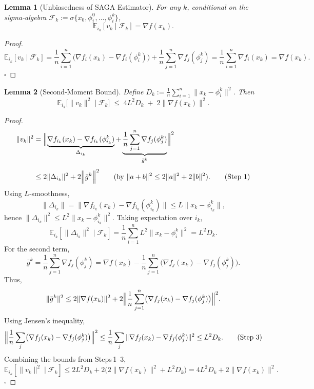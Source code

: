\documentclass{article}
\newtheorem{lemma}{Lemma}
\newcommand{\E}{\mathbb{E}}
\begin{document}
\begin{lemma}[Unbiasedness of SAGA Estimator]\label{lem:unbiased}
For any $k$, conditional on the sigma‑algebra $\mathcal{F}_k:=\sigma\{x_0,\phi_i^0,\dots,\phi_i^k\}$,
\[
\E_{i_k}[v_k\mid\mathcal{F}_k]=\nabla f(x_k).
\]
\end{lemma}
\begin{proof}
\[
\E_{i_k}[v_k\mid\mathcal{F}_k]
=\frac1n\sum_{i=1}^{n}\bigl(\nabla f_i(x_k)-\nabla f_i(\phi_i^k)\bigr)
+\frac1n\sum_{j=1}^{n}\nabla f_j(\phi_j^k)
=\frac1n\sum_{i=1}^{n}\nabla f_i(x_k)=\nabla f(x_k).
\] \hfill $\square$
\end{proof}

\begin{lemma}[Second‑Moment Bound]\label{lem:second}
Define $D_k:=\frac1n\sum_{i=1}^{n}\|x_k-\phi_i^k\|^{2}$.  Then
\[
\E_{i_k}\!\bigl[\|v_k\|^{2}\mid\mathcal{F}_k\bigr]
\;\le\;
4L^{2}D_k\;+\;2\|\nabla f(x_k)\|^{2}.
\tag{5}
\]
\end{lemma}
\begin{proof}
\[
\begin{aligned}
\|v_k\|^{2}
&=\Bigl\|\underbrace{\nabla f_{i_k}(x_k)-\nabla f_{i_k}(\phi_{i_k}^k)}_{\Delta_{i_k}}
+\underbrace{\frac1n\sum_{j=1}^{n}\nabla f_j(\phi_j^k)}_{\bar g^k}\Bigr\|^{2}\\[4pt]
&\le 2\|\Delta_{i_k}\|^{2}+2\Bigl\|\bar g^k\Bigr\|^{2}
\qquad\text{(by } \|a+b\|^{2}\le2\|a\|^{2}+2\|b\|^{2}\text{)}. \tag{Step 1}
\end{aligned}
\]
Using $L$‑smoothness,
\[
\|\Delta_{i_k}\|
= \|\nabla f_{i_k}(x_k)-\nabla f_{i_k}(\phi_{i_k}^k)\|
\le L\|x_k-\phi_{i_k}^k\|,
\]
hence $\|\Delta_{i_k}\|^{2}\le L^{2}\|x_k-\phi_{i_k}^k\|^{2}$.  Taking expectation over $i_k$,
\[
\E_{i_k}[\|\Delta_{i_k}\|^{2}\mid\mathcal{F}_k]
= \frac1n\sum_{i=1}^{n}L^{2}\|x_k-\phi_i^k\|^{2}
= L^{2}D_k. \tag{Step 2}
\]
For the second term,
\[
\bar g^k = \frac1n\sum_{j=1}^{n}\nabla f_j(\phi_j^k)
= \nabla f(x_k)-\frac1n\sum_{j=1}^{n}\bigl(\nabla f_j(x_k)-\nabla f_j(\phi_j^k)\bigr).
\]
Thus,
\[
\|\bar g^k\|^{2}
\le 2\|\nabla f(x_k)\|^{2}
+2\Bigl\|\frac1n\sum_{j=1}^{n}\bigl(\nabla f_j(x_k)-\nabla f_j(\phi_j^k)\bigr)\Bigr\|^{2}.
\]
Using Jensen’s inequality,
\[
\Bigl\|\frac1n\sum_{j}\bigl(\nabla f_j(x_k)-\nabla f_j(\phi_j^k)\bigr)\Bigr\|^{2}
\le \frac1n\sum_{j}\|\nabla f_j(x_k)-\nabla f_j(\phi_j^k)\|^{2}
\le L^{2}D_k. \tag{Step 3}
\]
Combining the bounds from Steps 1–3,
\[
\E_{i_k}[\|v_k\|^{2}\mid\mathcal{F}_k]
\le 2L^{2}D_k+2\bigl(2\|\nabla f(x_k)\|^{2}+L^{2}D_k\bigr)
=4L^{2}D_k+2\|\nabla f(x_k)\|^{2}.
\] \hfill $\square$
\end{proof}
\end{document}
